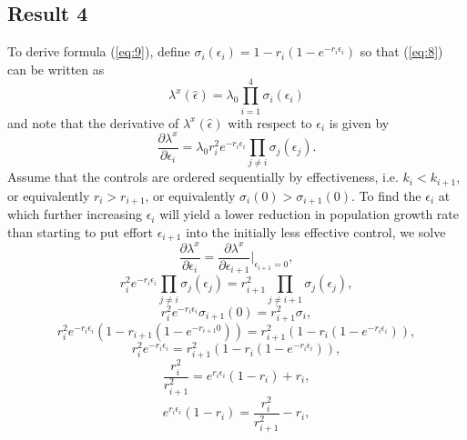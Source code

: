 \documentclass[onecolumn]{article}
\begin{document}
\subsection*{Result 4}
To derive formula (\ref{eq:9}), define $\sigma_i(\epsilon_i) = 1 - r_i(1 - e^{-r_i\epsilon_i})$ so that (\ref{eq:8}) can be written as
\begin{equation} \lambda^x(\hat{\epsilon}) = \lambda_0 \prod_{i=1}^4 \sigma_i(\epsilon_i) \end{equation}
and note that the derivative of $\lambda^x(\hat{\epsilon})$ with respect to $\epsilon_i$ is given by
\begin{equation} \frac{\partial \lambda^x}{\partial \epsilon_i} = \lambda_0 r_i^2 e^{-r_i\epsilon_i} \prod_{j \neq i} \sigma_j(\epsilon_j). \end{equation}
Assume that the controls are ordered sequentially by effectiveness, i.e. $k_i < k_{i+1}$, or equivalently $r_i > r_{i+1}$, or equivalently $\sigma_i(0) > \sigma_{i+1}(0)$. To find the $\epsilon_i$ at which further increasing $\epsilon_i$ will yield a lower reduction in population growth rate than starting to put effort $\epsilon_{i+1}$ into the initially less effective control, we solve 
\begin{equation} \frac{\partial \lambda^x}{\partial \epsilon_i} = \frac{\partial \lambda^x}{\partial \epsilon_{i+1}}\bigg|_{\epsilon_{i+1}=0}, \end{equation}
\begin{equation} r_i^2 e^{-r_i\epsilon_i} \prod_{j \neq i} \sigma_j(\epsilon_j) = r_{i+1}^2 \prod_{j \neq i+1} \sigma_j(\epsilon_j), \end{equation}
\begin{equation} r_i^2 e^{-r_i\epsilon_i} \sigma_{i+1}(0) = r_{i+1}^2 \sigma_i, \end{equation}
\begin{equation} r_i^2 e^{-r_i\epsilon_i} \left(1 - r_{i+1}(1 - e^{-r_{i+1}0})\right) = r_{i+1}^2 \left(1 - r_i(1 - e^{-r_i\epsilon_i})\right), \end{equation}
\begin{equation} r_i^2 e^{-r_i\epsilon_i} = r_{i+1}^2 \left(1 - r_i(1 - e^{-r_i\epsilon_i})\right), \end{equation}
\begin{equation} \frac{r_i^2}{r_{i+1}^2} = e^{r_i\epsilon_i} \left(1 - r_i\right) + r_i, \end{equation}
\begin{equation} e^{r_i\epsilon_i} \left(1 - r_i\right) = \frac{r_i^2}{r_{i+1}^2} - r_i, \end{equation}
\end{document}
